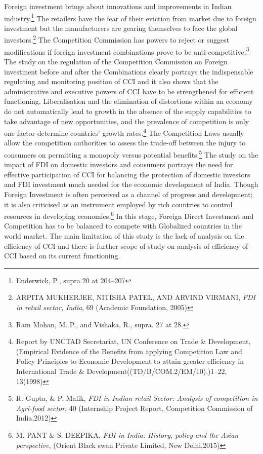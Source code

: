 \begin{multicols}{2}
\noi
Foreign investment brings about innovations and improvements in Indian industry.\footnote{Enderwick, P., supra.20 at 204--207} The
retailers have the fear of their eviction from market due to foreign investment but the
manufacturers are gearing themselves to face the global investors.\footnote{ARPITA MUKHERJEE, NITISHA PATEL, AND ARVIND VIRMANI, \textit{FDI in retail sector, India}, 69
(Academic Foundation, 2005)} The Competition
Commission has powers to reject or suggest modifications if foreign investment
combinations prove to be anti-competitive.\footnote{Ram Mohan, M. P., and Vishaka, R., supra. 27 at 28.} The study on the regulation of the Competition
Commission on Foreign investment before and after the Combinations clearly portrays the
indispensable regulating and monitoring position of CCI and it also shows that the
administrative and executive powers of CCI have to be strengthened for efficient functioning.
Liberalisation and the elimination of distortions within an economy do not automatically lead
to growth in the absence of the supply capabilities to take advantage of new opportunities,
and the prevalence of competition is only one factor determine countries' growth rates.\footnote{Report by UNCTAD Secretariat, UN Conference on Trade \& Development, (Empirical Evidence of the
Benefits from applying Competition Law and Policy Principles to Economic Development to attain greater
efficiency in International Trade \& Development((TD/B/COM.2/EM/10).)1--22, 13(1998)} The
Competition Laws usually allow the competition authorities to assess the trade-off between
the injury to consumers on permitting a monopoly versus potential benefits.\footnote{R. Gupta, \& P. Malik, \textit{FDI in Indian retail Sector: Analysis of competition in Agri-food sector}, 40 (Internship
Project Report, Competition Commission of India,2012)} The study on
the impact of FDI on domestic investors and consumers portrays the need for effective
participation of CCI for balancing the protection of domestic investors and FDI investment
much needed for the economic development of India. Though Foreign Investment is often
perceived as a channel of progress and development; it is also criticised as an instrument
employed by rich countries to control resources in developing economies.\footnote{M. PANT \& S. DEEPIKA, \textit{FDI in India: History, policy and the Asian perspective}, (Orient Black swan Private
Limited, New Delhi,2015)} In this stage,
Foreign Direct Investment and Competition has to be balanced to compete with Globalized
countries in the world market. The main limitation of this study is the lack of analysis on the
efficiency of CCI and there is further scope of study on analysis of efficiency of CCI based
on its current functioning.


\end{multicols}

